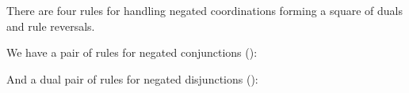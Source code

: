 \begin{fitchrule}
  \label{def:de-morgan-rules}
  \leavevmode
  There are four rules for handling negated coordinations forming a square of
  duals and rule reversals.

  We have a pair of rules for negated conjunctions (\enot\eand): \\

  And a dual pair of rules for negated disjunctions (\enot\eor): \\
\end{fitchrule}

